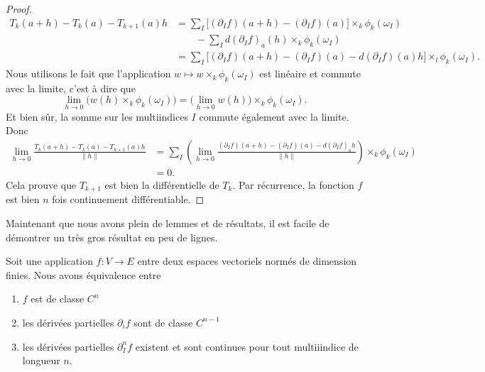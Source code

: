\begin{proof}
    \begin{subequations}
        \begin{align}
            T_k(a+h)-T_k(a)-T_{k+1}(a)h&=\sum_I\big[ (\partial_If)(a+h)-(\partial_If)(a) \big]\times_k\phi_k(\omega_I)\\
                                        &\qquad-\sum_Id(\partial_If)_a(h)\times_k\phi_k(\omega_I)\\
                                        &=\sum_I\big[ (\partial_If)(a+h)-(\partial_If)(a)-d(\partial_If)(a)h \big]\times_l\phi_k(\omega_I).
        \end{align}
    \end{subequations}
    Nous utilisons le fait que l'application \( w\mapsto w\times_k\phi_k(\omega_I)\) est linéaire et commute avec la limite, c'est à dire que
    \begin{equation}
        \lim_{h\to 0} \big( w(h)\times_k\phi_k(\omega_I) \big)=\big( \lim_{h\to 0} w(h) \big)\times_k\phi_k(\omega_I).
    \end{equation}
    Et bien sûr, la somme sur les multiindices \( I\) commute également avec la limite. Donc
    \begin{subequations}
        \begin{align}
        \lim_{h\to 0} \frac{ T_k(a+h)-T_k(a)-T_{k+1}(a)h }{ \| h \| }&=\sum_I\left( \lim_{h\to 0} \frac{ (\partial_If)(a+h)-(\partial_If)(a)-d(\partial_If)_ah }{ \| h \| } \right)\times_k\phi_k(\omega_I)\\
        &=0.
        \end{align}
    \end{subequations}
    Cela prouve que \( T_{k+1}\) est bien la différentielle de \( T_k\). Par récurrence, la fonction \( f\) est bien \( n\) fois continuement différentiable.
\end{proof}

Maintenant que nous avons plein de lemmes et de résultats, il est facile de démontrer un très gros résultat en peu de lignes.

\begin{theorem}     \label{THOooPZTAooTASBhZ}
    Soit une application \( f\colon V\to E\) entre deux espaces vectoriels normés de dimension finies. Nous avons équivalence entre
    \begin{enumerate}
        \item       \label{ITEMooBOWTooXgxhpS}
            \( f\) est de classe \( C^n\)
        \item       \label{ITEMooPVZHooHihSRD}
            les dérivées partielles \( \partial_if\) sont de classe \( C^{n-1}\)
        \item       \label{ITEMooVBQMooBleazN}
            les dérivées partielles \( \partial^n_If\) existent et sont continues pour tout multiiindice de longueur \( n\).
    \end{enumerate}
\end{theorem}

